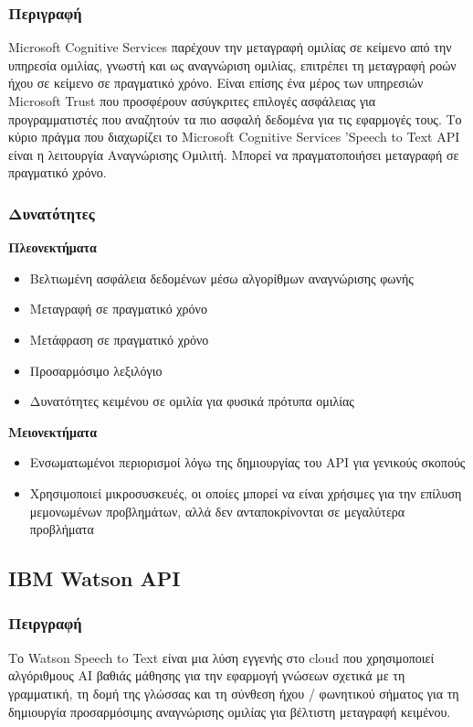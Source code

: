 \documentclass[oneside, 12pt]{book}
\begin{document}
\subsubsection{Περιγραφή}
Microsoft Cognitive Services παρέχουν την μεταγραφή ομιλίας σε κείμενο από την υπηρεσία ομιλίας,
γνωστή και ως αναγνώριση ομιλίας, επιτρέπει τη μεταγραφή ροών ήχου σε κείμενο σε πραγματικό χρόνο.
Είναι επίσης ένα μέρος των υπηρεσιών Microsoft Trust που προσφέρουν ασύγκριτες επιλογές ασφάλειας
για προγραμματιστές που αναζητούν τα πιο ασφαλή δεδομένα για τις εφαρμογές τους.
Το κύριο πράγμα που διαχωρίζει το Microsoft Cognitive Services ’Speech to Text API είναι η
λειτουργία Αναγνώρισης Ομιλιτή.
Μπορεί να πραγματοποιήσει μεταγραφή σε πραγματικό χρόνο.
\subsubsection{Δυνατότητες}
\noindent
\textbf{Πλεονεκτήματα}
\begin{itemize}
  \item Βελτιωμένη ασφάλεια δεδομένων μέσω αλγορίθμων αναγνώρισης φωνής
  \item Μεταγραφή σε πραγματικό χρόνο
  \item Μετάφραση σε πραγματικό χρόνο
  \item Προσαρμόσιμο λεξιλόγιο
  \item Δυνατότητες κειμένου σε ομιλία για φυσικά πρότυπα ομιλίας
\end{itemize}
\textbf{Μειονεκτήματα}
\begin{itemize}
  \item Ενσωματωμένοι περιορισμοί λόγω της δημιουργίας του API για γενικούς σκοπούς
  \item Χρησιμοποιεί μικροσυσκευές, οι οποίες μπορεί να είναι χρήσιμες για την επίλυση μεμονωμένων προβλημάτων, αλλά δεν ανταποκρίνονται σε μεγαλύτερα προβλήματα
\end{itemize}
\subsection{IBM Watson API}
\label{subsec:ibm-watson}
\subsubsection{Πειργραφή}
Το Watson Speech to Text είναι μια λύση εγγενής στο cloud που χρησιμοποιεί αλγόριθμους AI βαθιάς
μάθησης για την εφαρμογή γνώσεων σχετικά με τη γραμματική, τη δομή της γλώσσας και τη σύνθεση ήχου /
φωνητικού σήματος για τη δημιουργία προσαρμόσιμης αναγνώρισης ομιλίας για βέλτιστη μεταγραφή
κειμένου.
\end{document}
